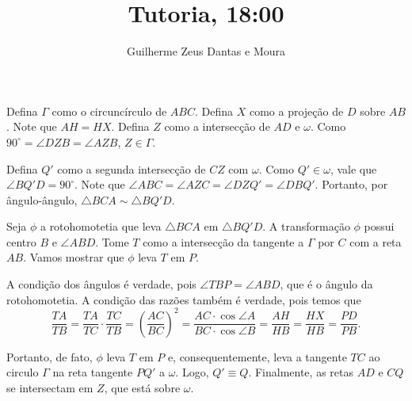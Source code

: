 \documentclass[10pt,a4paper]{article}
\title{Tutoria, 18:00}
\author{Guilherme Zeus Dantas e Moura}
\begin{document}
	
 	\zeustitle

	\begin{sol}
		Defina $\Gamma$ como o circuncírculo de $ABC$.
		Defina $X$ como a projeção de $D$ sobre $AB$. Note que $AH = HX$.
		Defina $Z$ como a intersecção de $AD$ e $\omega$. Como $90^\circ = \angle DZB = \angle AZB$,  $Z \in \Gamma$.

		Defina $Q'$ como a segunda intersecção de $CZ$ com $\omega$. Como $Q' \in \omega$, vale que $\angle BQ'D = 90^\circ$. Note que $\angle ABC = \angle AZC = \angle DZQ' = \angle DBQ'$. Portanto, por ângulo-ângulo, $\triangle BCA \sim \triangle BQ'D$.

		Seja $\phi$ a rotohomotetia que leva $\triangle BCA$ em $\triangle BQ'D$. A transformação $\phi$ possui centro $B$ e $\angle ABD$. 
		Tome $T$ como a intersecção da tangente a $\Gamma$ por $C$ com a reta $AB$. Vamos mostrar que $\phi$ leva $T$ em $P$.

		A condição dos ângulos é verdade, pois $\angle TBP = \angle ABD$, que é o ângulo da rotohomotetia.
		A condição das razões também é verdade, pois temos que  \[
			\frac{TA}{TB} = \frac{TA}{TC}\cdot\frac{TC}{TB} = \left(\frac{AC}{BC}\right)^2 = \frac{AC\cdot\cos\angle A}{BC\cdot\cos\angle B} = \frac{AH}{HB} = \frac{HX}{HB} = \frac{PD}{PB}.
		\]

		Portanto, de fato, $\phi$ leva $T$ em $P$ e, consequentemente, leva a tangente $TC$ ao circulo $\Gamma$ na reta tangente $PQ'$ a $\omega$. Logo, $Q' \equiv Q$.  
		Finalmente, as retas $AD$ e $CQ$ se intersectam em $Z$, que está sobre $\omega$.
	\end{sol}
\end{document}
